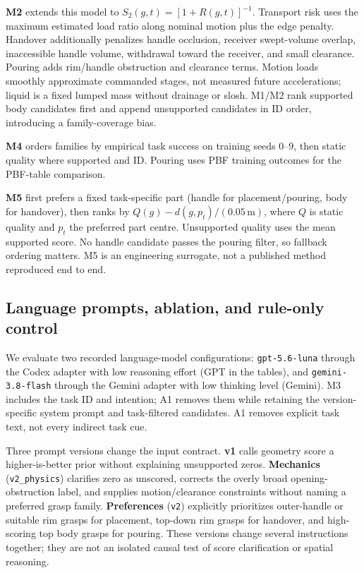 \documentclass{article}
\newcommand{\code}[1]{\texttt{#1}}
\begin{document}
\textbf{M2} extends this model to $S_2(g,t)=[1+R(g,t)]^{-1}$. Transport risk uses the maximum estimated load ratio along nominal motion plus the edge penalty. Handover additionally penalizes handle occlusion, receiver swept-volume overlap, inaccessible handle volume, withdrawal toward the receiver, and small clearance. Pouring adds rim/handle obstruction and clearance terms. Motion loads smoothly approximate commanded stages, not measured future accelerations; liquid is a fixed lumped mass without drainage or slosh. M1/M2 rank supported body candidates first and append unsupported candidates in ID order, introducing a family-coverage bias.

\textbf{M4} orders families by empirical task success on training seeds 0--9, then static quality where supported and ID. Pouring uses PBF training outcomes for the PBF-table comparison.

\textbf{M5} first prefers a fixed task-specific part (handle for placement/pouring, body for handover), then ranks by $Q(g)-d(g,p_t)/(0.05\,\mathrm m)$, where $Q$ is static quality and $p_t$ the preferred part centre. Unsupported quality uses the mean supported score. No handle candidate passes the pouring filter, so fallback ordering matters. M5 is an engineering surrogate, not a published method reproduced end to end.

\subsection{Language prompts, ablation, and rule-only control}
\label{sec:llm}
We evaluate two recorded language-model configurations: \code{gpt-5.6-luna} through the Codex adapter with low reasoning effort (GPT in the tables), and \code{gemini-3.8-flash} through the Gemini adapter with low thinking level (Gemini). M3 includes the task ID and intention; A1 removes them while retaining the version-specific system prompt and task-filtered candidates. A1 removes explicit task text, not every indirect task cue.

Three prompt versions change the input contract. \textbf{v1} calls geometry score a higher-is-better prior without explaining unsupported zeros. \textbf{Mechanics} (\code{v2\_physics}) clarifies zero as unscored, corrects the overly broad opening-obstruction label, and supplies motion/clearance constraints without naming a preferred grasp family. \textbf{Preferences} (\code{v2}) explicitly prioritizes outer-handle or suitable rim grasps for placement, top-down rim grasps for handover, and high-scoring top body grasps for pouring. These versions change several instructions together; they are not an isolated causal test of score clarification or spatial reasoning.
\end{document}
